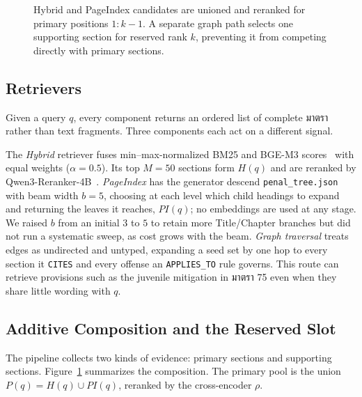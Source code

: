 \documentclass[conference]{IEEEtran}
\providecommand{\TH}{}\renewcommand{\TH}[1]{{\thaifont #1}}
\begin{document}
\begin{figure}[t]
  \centering
  \resizebox{0.96\textwidth}{!}{}
  \caption{Hybrid and PageIndex candidates are unioned and
  reranked for primary positions $1{:}k{-}1$. A separate graph path selects one supporting section
  for reserved rank $k$, preventing it from competing directly with primary sections.}
  \label{fig:arch}
\end{figure}

\subsection{Retrievers}

Given a query $q$, every component returns an ordered list of complete \TH{มาตรา} rather than text
fragments. Three components each act on a different signal.

The \textit{Hybrid} retriever fuses min--max-normalized BM25 and BGE-M3
scores~\cite{chen2024bgem3} with equal weights ($\alpha = 0.5$). Its top $M = 50$ sections form
$H(q)$ and are reranked by Qwen3-Reranker-4B~\cite{zhang2025qwen3embedding}.
\textit{PageIndex} has the generator descend \texttt{penal\_tree.json} with beam width $b = 5$,
choosing at each level which child headings to expand and returning the leaves it reaches,
$P\!I(q)$; no embeddings are used at any stage. We raised $b$ from an initial $3$ to $5$ to retain
more Title/Chapter branches but did not run a systematic sweep, as cost grows with the beam. \textit{Graph traversal} treats edges as undirected
and untyped, expanding a seed set by one hop to every section it \texttt{CITES} and every offense an
\texttt{APPLIES\_TO} rule governs. This route can retrieve provisions such as the juvenile
mitigation in \TH{มาตรา} 75 even when they share little wording with $q$.

\subsection{Additive Composition and the Reserved Slot}

The pipeline collects two kinds of evidence: primary sections and supporting sections.
Figure~\ref{fig:arch} summarizes the composition. The primary pool is the union
$P(q) = H(q) \cup P\!I(q)$, reranked by the cross-encoder $\rho$.
\end{document}
